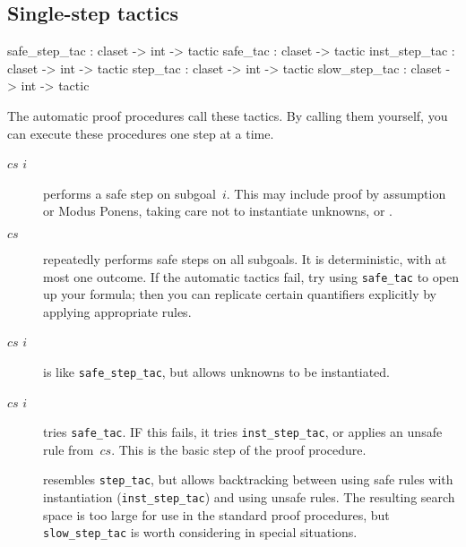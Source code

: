 \subsection{Single-step tactics}
\begin{ttbox} 
safe_step_tac : claset -> int -> tactic
safe_tac      : claset        -> tactic
inst_step_tac : claset -> int -> tactic
step_tac      : claset -> int -> tactic
slow_step_tac : claset -> int -> tactic
\end{ttbox}
The automatic proof procedures call these tactics.  By calling them
yourself, you can execute these procedures one step at a time.
\begin{description}
\item[ $cs$ $i$] performs a safe step on
subgoal~$i$.  This may include proof by assumption or Modus Ponens, taking
care not to instantiate unknowns, or .

\item[ $cs$] repeatedly performs safe steps on all 
subgoals.  It is deterministic, with at most one outcome.  If the automatic
tactics fail, try using {\tt safe_tac} to open up your formula; then you
can replicate certain quantifiers explicitly by applying appropriate rules.

\item[ $cs$ $i$] is like {\tt safe_step_tac},
but allows unknowns to be instantiated.

\item[ $cs$ $i$] tries {\tt safe_tac}.  IF this
fails, it tries {\tt inst_step_tac}, or applies an unsafe rule from~$cs$.
This is the basic step of the proof procedure.

\item[] 
  resembles {\tt step_tac}, but allows backtracking between using safe
  rules with instantiation ({\tt inst_step_tac}) and using unsafe rules.
  The resulting search space is too large for use in the standard proof
  procedures, but {\tt slow_step_tac} is worth considering in special
  situations.
\end{description}


